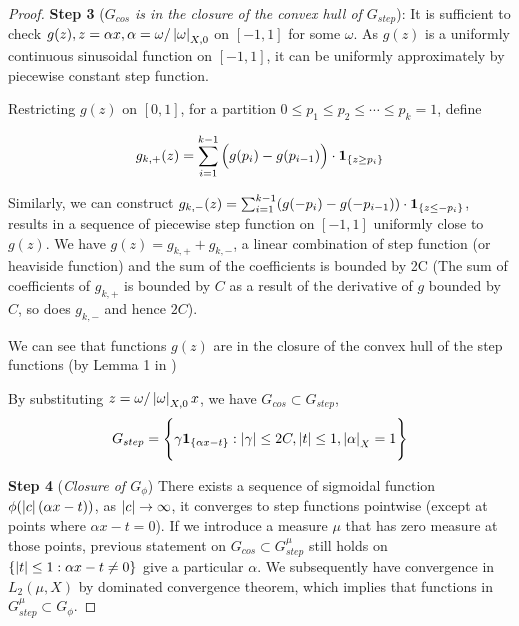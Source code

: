\begin{proof}
    \textbf{Step 3} (\textit{$G_{cos}$ is in the closure of the convex hull of
        $G_{step}$}): It is sufficient to check $g(z), z = \alpha x, \alpha =
        \omega/\left| \omega \right|_{X,0}$ on $[-1, 1]$ for some $\omega$. As $g(z)$ is a
    uniformly continuous sinusoidal function on $[-1, 1]$, it can be uniformly
    approximately by piecewise constant step function.

    Restricting $g(z)$ on $[0, 1]$, for a partition ${0 \leq p_1 \leq p_2 \leq
                \cdots \leq p_k = 1}$, define

    \begin{align}
        g_{k,+}(z) = \sum_{i=1}^{k-1} \Big(g(p_i) - g(p_{i-1})\Big) \cdot
        \mathbf{1}_{\{z\geq p_i\}}
    \end{align}

    Similarly, we can construct $g_{k,-}(z) = \sum_{i=1}^{k-1} (g(-p_i) -
        g(-p_{i-1})) \cdot \mathbf{1}_{\{z\leq -p_i\}}$, results in a sequence of
    piecewise step function on $[-1, 1]$ uniformly close to $g(z)$. We have
    $g(z) = g_{k,+}+g_{k,-}$, a linear combination of step function (or
    heaviside function) and the sum of the coefficients is bounded by 2C (The
    sum of coefficients of $g_{k,+}$ is bounded by $C$ as a result of the
    derivative of $g$ bounded by $C$, so does $g_{k,-}$ and hence $2C$).

    We can see that functions $g(z)$ are in the closure of the convex hull of
    the step functions (by Lemma 1 in
    \cite{barronUniversalApproximationBounds1993})

    By substituting $z = \omega/\left| \omega \right|_{X, 0} x$, we have $G_{cos} \subset
        G_{step}$,
    \begin{equation}
        G_{step} = \Bigg\{ \gamma\mathbf{1}_{\{\alpha x-t\}}: \left| \gamma \right| \leq 2C, \left| t \right| \leq 1, \left| \alpha \right|_{X} = 1\Bigg\}
    \end{equation}

    \textbf{Step 4} (\textit{Closure of $G_{\phi}$}) There exists a sequence of
    sigmoidal function $\phi(\left| c \right|(\alpha x - t))$, as $\left| c \right| \to \infty$,
    it converges to step functions pointwise (except at points where $\alpha x -
        t = 0$). If we introduce a measure $\mu$ that has zero measure at those
    points, previous statement on $G_{cos} \subset G^{\mu}_{step}$ still holds
    on $\{\left| t \right| \leq 1: \alpha x - t \not=0\}$ give a particular $\alpha$. We
    subsequently have convergence in $L_2(\mu, X)$ by dominated convergence
    theorem, which implies that functions in $G^{\mu}_{step} \subset G_{\phi}$.


\end{proof}
